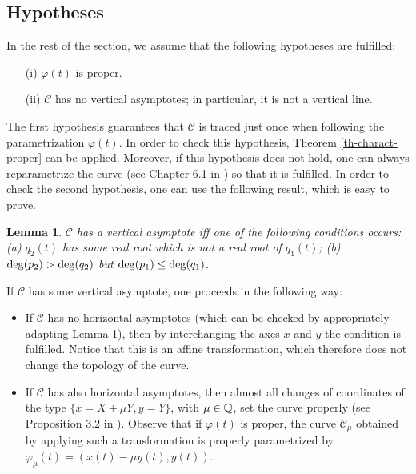 \documentclass{elsart}
\def\deg{{\rm deg}}
\newtheorem{lemma}[theorem]{{\bf Lemma}}
\begin{document}
\subsection{Hypotheses}\label{subsec-hyp}

In the rest of the section, we assume that the following hypotheses are fulfilled:

\begin{itemize}
\item [(i)] $\varphi(t)$ is proper.
\item [(ii)] ${\mathcal C}$ has no vertical asymptotes; in particular, it is not a vertical line.
\end{itemize}

The first hypothesis guarantees that ${\mathcal C}$ is traced just
once when following the parametrization $\varphi(t)$. In order to
check this hypothesis, Theorem
\ref{th-charact-proper} can be applied. Moreover, if this hypothesis does not
hold, one can always reparametrize the curve (see Chapter 6.1 in
\cite{SWPD}) so that it is fulfilled. In order to check the second
hypothesis, one can use the following result, which is easy to prove.

\begin{lemma} \label{asymp-plane}
${\mathcal C}$ has a vertical asymptote iff one of the following
conditions occurs: (a) $q_2(t)$ has some real root which is not a
real root of $q_1(t)$; (b) $\deg(p_2)>\deg(q_2)$ but
$\deg(p_1)\leq \deg(q_1)$.
\end{lemma}








If ${\mathcal C}$ has some vertical asymptote, one proceeds in the following way:

\begin{itemize}
\item If  ${\mathcal C}$
has no horizontal asymptotes (which can be checked by
appropriately adapting Lemma \ref{asymp-plane}), then by interchanging
the axes $x$ and $y$ the condition is fulfilled. Notice that this is an affine
transformation, which therefore does not change the topology of the curve.
\item If ${\mathcal C}$ has also horizontal asymptotes, then
almost all changes of
coordinates of the type $\{x=X+\mu Y,y=Y\}$, with $\mu\in {\Bbb
Q}$, set the curve properly (see Proposition 3.2 in
\cite{LaloCompl}). Observe that if $\varphi(t)$ is proper, the curve ${\mathcal
C}_{\mu}$ obtained by applying such a transformation is properly
parametrized by $\varphi_\mu(t)=(x(t)-\mu y(t),y(t))$.
\end{itemize}
\end{document}
